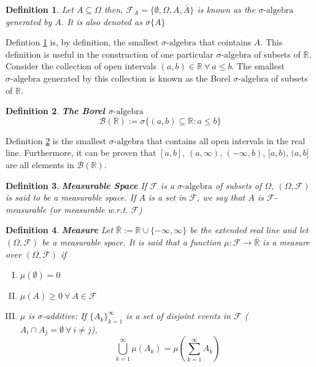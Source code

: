 \documentclass[11pt]{report}
\newtheorem{definition}{Definition}[chapter]
\newcommand{\RNums}{\mathbb{R}}
\newcommand{\salg}{\sigma\text{-algebra}}
\newcommand{\borelsalg}{\mathscr{B}(\RNums)}
\newcommand{\salgF}{\mathscr{F}}
\begin{document}
\begin{definition}\label{salgebra_generated}
	Let $A \subseteq \Omega$ then, $\salgF_A = \{\emptyset, \Omega, A, \bar{A}\}$ is known as the $\salg$ generated by $A$. It is also denoted as $\sigma\{A\}$
\end{definition}

Defintion \ref{salgebra_generated} is, by definition, the smallest $\salg$ that cointains $A$. This definition is useful in the construction of one particular $\salg$ of subsets of $\RNums$.\\

Consider the collection of open intervals $(a,b) \in \RNums \ \forall \ a \leq b$. The smallest $\salg$ generated by this collection is known as the Borel $\salg$ of subsets of $\RNums$.

\begin{definition}{\textbf{The Borel $\salg$}}\label{borel_sigma_alg}
		\begin{equation}
			\borelsalg := \sigma\{(a,b) \subseteq \RNums:a\leq b\}
		\end{equation}
\end{definition}

Definition \ref{borel_sigma_alg} is the smallest $\salg$ that contains all open intervals in the real line. Furthermore, it can be proven that $[a, b]$, $(a,\infty)$, $(-\infty, b)$, $[a, b)$, $(a, b]$ are all elements in $\borelsalg$. 

\begin{definition}{\textbf{Measurable Space}}
	If $\salgF$ is a $\salg$ of subsets of $\Omega$, $(\Omega, \salgF)$ is said to be a measurable space. If $A$ is a set in $\salgF$, we say that $A$ is $\salgF$-measurable (or measurable w.r.t. $\salgF$)
\end{definition}

\begin{definition}{\textbf{Measure}}
	Let $\bar{\mathbb R} := \mathbb R \cup \{-\infty, \infty\}$ be the extended real line and let $(\Omega, \salgF)$ be a measurable space. It is said that a function $\mu: \salgF \rightarrow \bar{\mathbb R}$ is a measure over $(\Omega, \salgF)$ if
	\begin{enumerate}[I.]
		\item $\mu(\emptyset) = 0$
		\item $\mu(A) \geq 0\ \forall \ A \in \salgF $
		\item $\mu$ is $\sigma$-additive: If $\{A_k\}_{k=1}^{\infty}$ is a set of disjoint events in $\salgF$ ($A_i \cap A_j = \emptyset \ \forall \ i \neq j$), 
		\begin{equation*}
			\bigcup_{k=1}^{\infty} \mu(A_k) = \mu(\sum_{k=1}^{\infty} A_k)
		\end{equation*}
	\end{enumerate}
\end{definition}
\end{document}
